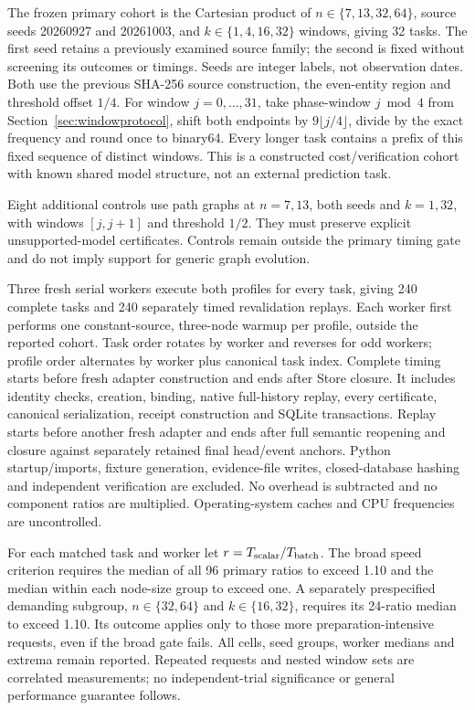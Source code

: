 \documentclass[11pt,a4paper]{article}
\theoremstyle{definition}\newtheorem{definition}[theorem]{Definition}
\begin{document}
The frozen primary cohort is the Cartesian product of $n\in\{7,13,32,64\}$, source seeds 20260927 and 20261003, and $k\in\{1,4,16,32\}$ windows, giving 32 tasks. The first seed retains a previously examined source family; the second is fixed without screening its outcomes or timings. Seeds are integer labels, not observation dates. Both use the previous SHA-256 source construction, the even-entity region and threshold offset $1/4$. For window $j=0,\ldots,31$, take phase-window $j\bmod4$ from Section~\ref{sec:windowprotocol}, shift both endpoints by $9\lfloor j/4\rfloor$, divide by the exact frequency and round once to binary64. Every longer task contains a prefix of this fixed sequence of distinct windows. This is a constructed cost/verification cohort with known shared model structure, not an external prediction task.

Eight additional controls use path graphs at $n=7,13$, both seeds and $k=1,32$, with windows $[j,j+1]$ and threshold $1/2$. They must preserve explicit unsupported-model certificates. Controls remain outside the primary timing gate and do not imply support for generic graph evolution.

Three fresh serial workers execute both profiles for every task, giving 240 complete tasks and 240 separately timed revalidation replays. Each worker first performs one constant-source, three-node warmup per profile, outside the reported cohort. Task order rotates by worker and reverses for odd workers; profile order alternates by worker plus canonical task index. Complete timing starts before fresh adapter construction and ends after Store closure. It includes identity checks, creation, binding, native full-history replay, every certificate, canonical serialization, receipt construction and SQLite transactions. Replay starts before another fresh adapter and ends after full semantic reopening and closure against separately retained final head/event anchors. Python startup/imports, fixture generation, evidence-file writes, closed-database hashing and independent verification are excluded. No overhead is subtracted and no component ratios are multiplied. Operating-system caches and CPU frequencies are uncontrolled.

For each matched task and worker let $r=T_{\rm scalar}/T_{\rm batch}$. The broad speed criterion requires the median of all 96 primary ratios to exceed 1.10 and the median within each node-size group to exceed one. A separately prespecified demanding subgroup, $n\in\{32,64\}$ and $k\in\{16,32\}$, requires its 24-ratio median to exceed 1.10. Its outcome applies only to those more preparation-intensive requests, even if the broad gate fails. All cells, seed groups, worker medians and extrema remain reported. Repeated requests and nested window sets are correlated measurements; no independent-trial significance or general performance guarantee follows.
\end{document}

